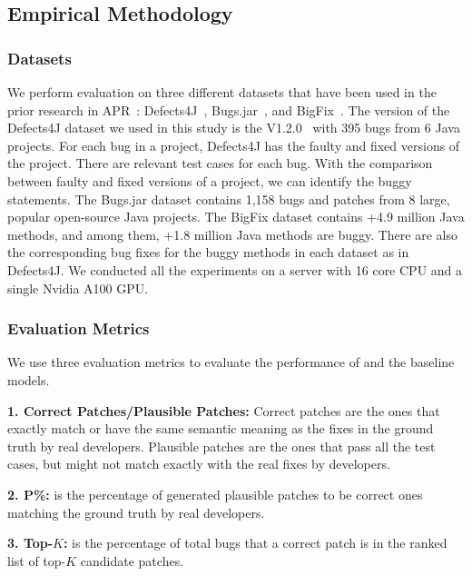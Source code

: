 \subsection{Empirical Methodology}

\subsubsection{Datasets}
We perform evaluation on three different datasets that have been used
in the prior research in APR~\cite{icse20}:
Defects4J~\cite{defects4j}, Bugs.jar~\cite{saha2018bugs}, and
BigFix~\cite{yioopsla19}. The version of the Defects4J dataset we used
in this study is the V1.2.0~\cite{defects4j} with 395 bugs
from 6 Java projects. For each bug in a project, Defects4J has the
faulty and fixed versions of the project. There are relevant test
cases for each bug. With the  comparison between faulty and
fixed versions of a project, we can identify the buggy statements. The
Bugs.jar dataset contains 1,158 bugs and patches from 8 large, popular
open-source Java projects. The BigFix dataset contains +4.9 million
Java methods, and among them, +1.8 million Java methods are
buggy. There are also the corresponding bug fixes for the buggy
methods in each dataset as in Defects4J. We conducted all the
experiments on a server with 16 core CPU and a single Nvidia A100 GPU.

\subsubsection{Evaluation Metrics}

We use three evaluation metrics to evaluate the performance of \tool
and the baseline models.

{\bf 1. Correct Patches/Plausible Patches:} Correct patches are the
ones that exactly match or have the same semantic meaning as the fixes in the
ground truth by real developers. Plausible patches are the ones
that pass all the test cases, but might not match exactly with the
real fixes by developers.

{\bf 2. P\%:} is the percentage of generated plausible patches to
be correct ones matching the ground truth by real developers.

{\bf 3. Top-$K$:} is the percentage of total bugs that a correct
patch is in the ranked list of top-$K$ candidate patches.

